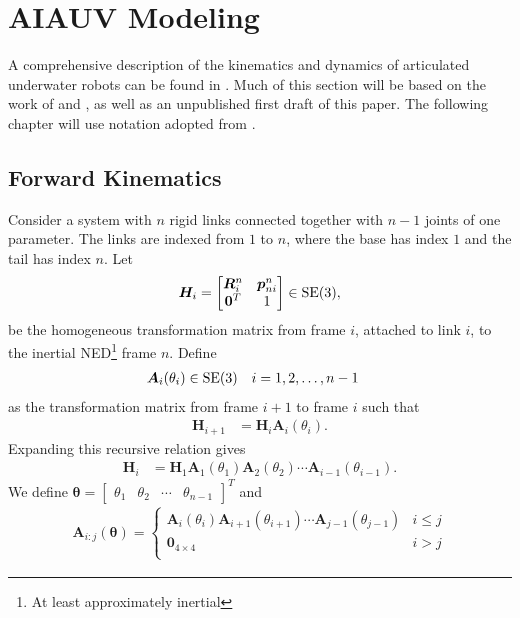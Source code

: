 \newpage
\section{AIAUV Modeling}

A comprehensive description of the kinematics and dynamics of articulated
underwater robots can be found in \cite{schmidt2018}. Much of this section
will be based on the work of \cite{from2014} and \cite{schmidt2018}, as well as an unpublished
first draft of this paper. The following chapter will use notation adopted from
\cite{from2014}.

\subsection{Forward Kinematics}
\label{sec:forward_kinematics}
Consider a system with $n$ rigid links connected together with $n-1$ joints
of one parameter. The links are indexed from $1$ to $n$, where the base
has index $1$ and the tail has index $n$. Let
\begin{align}
    \bm{H}_i = \begin{bmatrix}
        \bm{R}_i^n & \bm{p}_{ni}^n \\
        \bm{0}^T & 1
    \end{bmatrix} \in \operatorname{SE}(3),
\end{align}
be the homogeneous transformation matrix from frame $i$, attached to link $i$,
to the inertial NED\footnote{At least approximately inertial} frame $n$. Define
\begin{align}
    \bm{A}_i(\theta_i) &\in \operatorname{SE}(3) & i &= 1, 2, \ldots, n-1
\end{align}
as the transformation matrix from frame $i+1$ to frame $i$ such that
\begin{align}
    \bm{H}_{i+1} &= \bm{H}_i \bm{A}_i(\theta_i).
\end{align}
Expanding this recursive relation gives
\begin{align}
    \bm{H}_i &= \bm{H}_1 \bm{A}_1(\theta_1) \bm{A}_2(\theta_2) \cdots \bm{A}_{i-1}(\theta_{i-1}).
\end{align}
We define $\bm{\theta} = \begin{bmatrix}\theta_1 & \theta_2 & \cdots & \theta_{n-1}\end{bmatrix}^T$
and
\begin{align}
    \bm{A}_{i:j}(\bm{\theta}) =
    \begin{cases}
        \bm{A}_i(\theta_i) \bm{A}_{i+1}(\theta_{i+1}) \cdots \bm{A}_{j-1}(\theta_{j-1}) & i \leq j \\
        \bm{0}_{4 \times 4} & i > j \\
    \end{cases}
\end{align}
